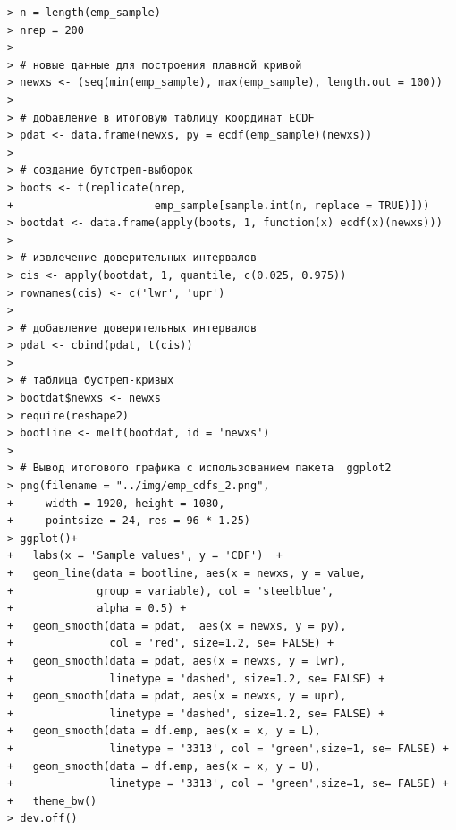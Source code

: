 \documentclass[14pt,a4paper]{scrartcl}
\begin{document}
\begin{verbatim}
> n = length(emp_sample)
> nrep = 200
> 
> # новые данные для построения плавной кривой
> newxs <- (seq(min(emp_sample), max(emp_sample), length.out = 100))
> 
> # добавление в итоговую таблицу координат ECDF
> pdat <- data.frame(newxs, py = ecdf(emp_sample)(newxs))
> 
> # создание бутстреп-выборок
> boots <- t(replicate(nrep, 
+                      emp_sample[sample.int(n, replace = TRUE)]))
> bootdat <- data.frame(apply(boots, 1, function(x) ecdf(x)(newxs))) 
> 
> # извлечение доверительных интервалов
> cis <- apply(bootdat, 1, quantile, c(0.025, 0.975))
> rownames(cis) <- c('lwr', 'upr')
> 
> # добавление доверительных интервалов
> pdat <- cbind(pdat, t(cis))
> 
> # таблица бустреп-кривых
> bootdat$newxs <- newxs
> require(reshape2)
> bootline <- melt(bootdat, id = 'newxs')
> 
> # Вывод итогового графика с использованием пакета  ggplot2
> png(filename = "../img/emp_cdfs_2.png", 
+     width = 1920, height = 1080,
+     pointsize = 24, res = 96 * 1.25)
> ggplot()+
+   labs(x = 'Sample values', y = 'CDF')  + 
+   geom_line(data = bootline, aes(x = newxs, y = value,
+             group = variable), col = 'steelblue', 
+             alpha = 0.5) +
+   geom_smooth(data = pdat,  aes(x = newxs, y = py), 
+               col = 'red', size=1.2, se= FALSE) +
+   geom_smooth(data = pdat, aes(x = newxs, y = lwr), 
+               linetype = 'dashed', size=1.2, se= FALSE) +
+   geom_smooth(data = pdat, aes(x = newxs, y = upr), 
+               linetype = 'dashed', size=1.2, se= FALSE) +
+   geom_smooth(data = df.emp, aes(x = x, y = L), 
+               linetype = '3313', col = 'green',size=1, se= FALSE) +
+   geom_smooth(data = df.emp, aes(x = x, y = U), 
+               linetype = '3313', col = 'green',size=1, se= FALSE) +
+   theme_bw()
> dev.off()
\end{verbatim}

\begin{figure}[h]
\end{figure}
\end{document}
